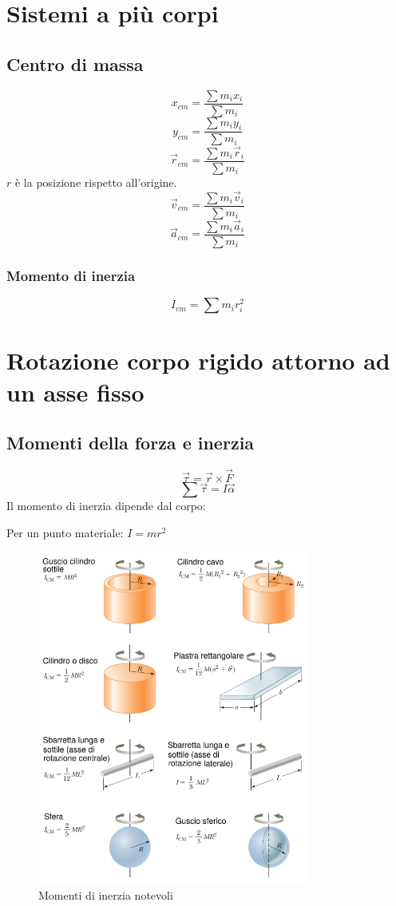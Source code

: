 \documentclass[a4paper]{article}
\theoremstyle{break}
\theoremstyle{break}
\theoremstyle{break}
\theoremstyle{break}
\begin{document}
\section{Sistemi a più corpi}
\subsection{Centro di massa}
\[
  x_{cm} = \frac{\sum m_i x_i}{\sum m_i}
\]
\[
  y_{cm} = \frac{\sum m_i y_i}{\sum m_i}
\]
\vspace{1em}
\[
  \vec{r}_{cm} = \frac{\sum m_i \vec{r}_i}{\sum m_i}
\] 
\( r \) è la posizione rispetto all'origine. 
\[
  \vec{v}_{cm} = \frac{\sum m_i \vec{v}_i}{\sum m_i}
\] 
\[
  \vec{a}_{cm} = \frac{\sum m_i \vec{a}_i}{\sum m_i}
\]
\subsubsection{Momento di inerzia}
\[
  I_{cm} = \sum m_i r_i^2
\]

\section{Rotazione corpo rigido attorno ad un asse fisso}
\subsection{Momenti della forza e inerzia}
\[
  \vec{\tau} = \vec{r} \times \vec{F}
\]
\[
  \sum \vec{\tau} = I \vec{\alpha}
\] 
Il momento di inerzia dipende dal corpo:

\noindent Per un punto materiale: \( I = m r^2 \)
\begin{figure}[H]
  \centering
  \includegraphics[width=0.8\textwidth]{inerzia}
  \caption{Momenti di inerzia notevoli}
  \label{fig:momenti_inerzia}
\end{figure}
\end{document}
